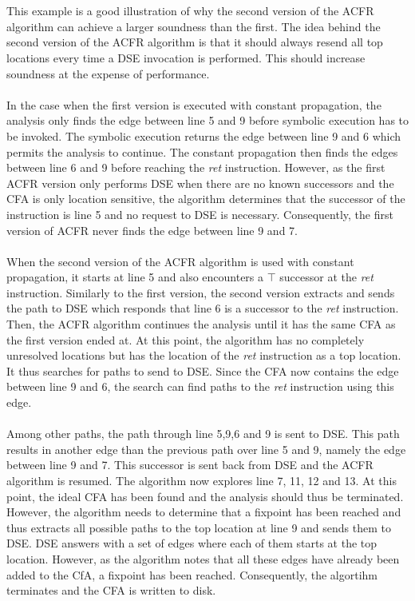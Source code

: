 \documentclass{kththesis}
\renewcommand{\it}[1]{\textit{#1}}
\begin{document}
\\ \\
This example is a good illustration of why the second version of the ACFR algorithm can achieve a larger soundness than the first. The idea behind the second version of the ACFR algorithm is that it should always resend all top locations every time a DSE invocation is performed. This should increase soundness at the expense of performance.
\\ \\
In the case when the first version is executed with constant propagation, the analysis only finds the edge between line 5 and 9 before symbolic execution has to be invoked. The symbolic execution returns the edge between line 9 and 6 which permits the analysis to continue. The constant propagation then finds the edges between line 6 and 9 before reaching the \it{ret} instruction. However, as the first ACFR version only performs DSE when there are no known successors and the CFA is only location sensitive, the algorithm determines that the successor of the instruction is line 5 and no request to DSE is necessary. Consequently, the first version of ACFR never finds the edge between line 9 and 7.
\\ \\
When the second version of the ACFR algorithm is used with constant propagation, it starts at line 5 and also encounters a $\top$ successor at the \it{ret} instruction. Similarly to the first version, the second version extracts and sends the path to DSE which responds that line 6 is a successor to the \it{ret} instruction. Then, the ACFR algorithm continues the analysis until it has the same CFA as the first version ended at. At this point, the algorithm has no completely unresolved locations but has the location of the \it{ret} instruction as a top location. It thus searches for paths to send to DSE. Since the CFA now contains the edge between line 9 and 6, the search can find paths to the \it{ret} instruction using this edge.
\\ \\
Among other paths, the path through line 5,9,6 and 9 is sent to DSE. This path results in another edge than the previous path over line 5 and 9, namely the edge between line 9 and 7. This successor is sent back from DSE and the ACFR algorithm is resumed. The algorithm now explores line 7, 11, 12 and 13. At this point, the ideal CFA has been found and the analysis should thus be terminated. However, the algorithm needs to determine that a fixpoint has been reached and thus extracts all possible paths to the top location at line 9 and sends them to DSE. DSE answers with a set of edges where each of them starts at the top location. However, as the algorithm notes that all these edges have already been added to the CfA, a fixpoint has been reached. Consequently, the algortihm terminates and the CFA is written to disk. 
\end{document}
